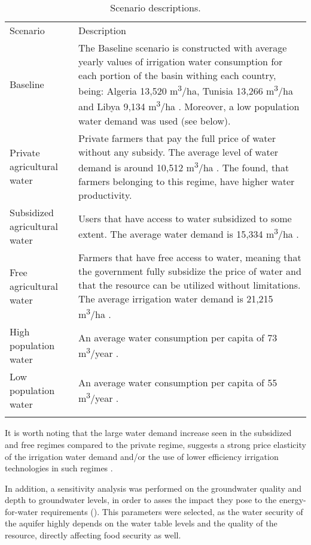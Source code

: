 \begin{table*}[!ht]
    \caption{\label{tbl:scenarios}Scenario descriptions.}
	\footnotesize{
	\begin{tabular}{@{}l P{4.1in}}
		\br
		Scenario & Description\\
		\mr
		Baseline & The Baseline scenario is constructed with average yearly values of irrigation water consumption for each portion of the basin withing each country, being: Algeria 13,520 m\textsuperscript{3}/ha, Tunisia 13,266 m\textsuperscript{3}/ha and Libya 9,134 m\textsuperscript{3}/ha \cite{Socioeconomicaspectsirrigation2014}. Moreover, a low population water demand was used \cite{Householdwaterconsumption2014} (see below).\\
		Private agricultural water & Private farmers that pay the full price of water without any subsidy. The average level of water demand is around 10,512 m\textsuperscript{3}/ha \cite{Socioeconomicaspectsirrigation2014}. The \citet{Socioeconomicaspectsirrigation2014} found, that farmers belonging to this regime, have higher water productivity.\\ 
		Subsidized agricultural water & Users that have access to water subsidized to some extent. The average water demand is 15,334 m\textsuperscript{3}/ha \cite{Socioeconomicaspectsirrigation2014}.\\
		Free agricultural water & Farmers that have free access to water, meaning that the government fully subsidize the price of water and that the resource can be utilized without limitations. The average irrigation water demand is 21,215 m\textsuperscript{3}/ha \cite{Socioeconomicaspectsirrigation2014}.\\
		High population water & An average water consumption per capita of 73 m\textsuperscript{3}/year \cite{Householdwaterconsumption2014}.\\
		Low population water & An average water consumption per capita of 55 m\textsuperscript{3}/year \cite{Householdwaterconsumption2014}.\\
		\br
	\end{tabular}
	}
\end{table*}

It is worth noting that the large water demand increase seen in the subsidized and free regimes compared to the private regime, suggests a strong price elasticity of the irrigation water demand and/or the use of lower efficiency irrigation technologies in such regimes \cite{Socioeconomicaspectsirrigation2014}.

In addition, a sensitivity analysis was performed on the groundwater quality and depth to groundwater levels, in order to asses the impact they pose to the energy-for-water requirements (). This parameters were selected, as the water security of the aquifer highly depends on the water table levels and the quality of the resource, directly affecting food security as well.

